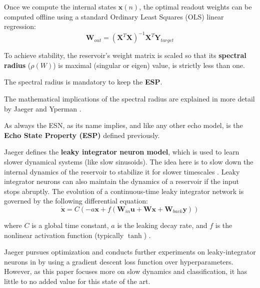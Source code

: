 \vspace{0.5cm}

Once we compute the internal states $\mathbf{x}(n)$, the optimal readout weights can be computed offline using a standard Ordinary Least Squares (OLS) linear regression:
\begin{equation}
    \mathbf{W}_{out} = (\mathbf{X}^T \mathbf{X})^{-1} \mathbf{X}^T \mathbf{Y}_{target}
\end{equation}

To achieve stability, the reservoir's weight matrix is scaled so that its \textbf{spectral radius} ($\rho(W)$) is maximal (singular or eigen) value, is strictly less than one.

The spectral radius is mandatory to keep the \textbf{ESP}.

The mathematical implications of the spectral radius are explained in more detail by Jaeger \cite{Jaeger10ESN} and Yperman \cite{yperman2016bayesian}.

\vspace{0.5cm}

As always the ESN, as its name implies, and like any other echo model, is the \textbf{Echo State Property (ESP)} defined previously.

\vspace{0.5cm}

Jaeger defines the \textbf{leaky integrator neuron model}, which is used to learn slower dynamical systems (like slow sinusoids). The idea here is to slow down the internal dynamics of the reservoir to stabilize it for slower timescales \cite{Jaeger10ESN}.
Leaky integrator neurons can also maintain the dynamics of a reservoir if the input stops abruptly.
The evolution of a continuous-time leaky integrator network is governed by the following differential equation:
\begin{equation}
    \mathbf{\dot{x}} = C \left( -a\mathbf{x} + f(\mathbf{W}_{in} \mathbf{u} + \mathbf{W} \mathbf{x} + \mathbf{W}_{back} \mathbf{y}) \right)
\end{equation}

where $C$ is a global time constant, $a$ is the leaking decay rate, and $f$ is the nonlinear activation function (typically $\tanh$) \cite{Jaeger10ESN}.

\vspace{0.5cm}

Jaeger pursues optimization and conducts further experiments on leaky-integrator neurons in \cite{jaeger2007optimization} by using a gradient descent loss function over hyperparameters. However, as this paper focuses more on slow dynamics and classification, it has little to no added value for this state of the art.

